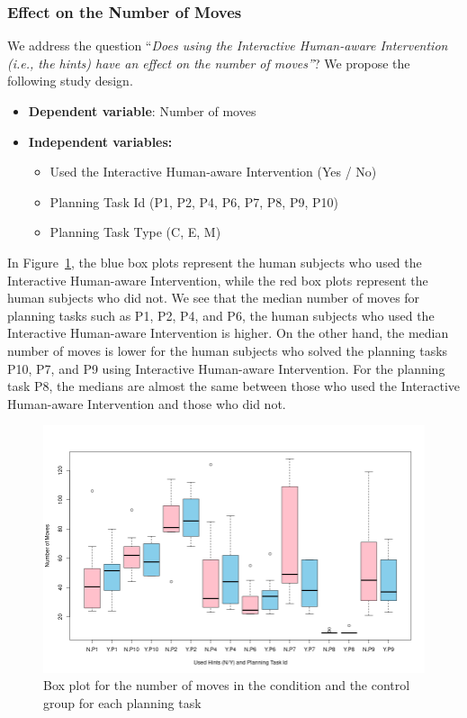 \subsubsection{Effect on the Number of Moves}
We address the question ``\textit{Does using the Interactive Human-aware Intervention (i.e., the hints) have an effect on the number of moves''}?
We propose the following study design.
\begin{itemize}
\item \textbf{Dependent variable}: Number of  moves
\item \textbf{Independent variables:}
\begin{itemize}
\item Used the Interactive Human-aware Intervention (Yes / No)
\item Planning Task Id (P1, P2, P4, P6, P7, P8, P9, P10)
\item Planning Task Type (C, E, M)
\end{itemize}
\end{itemize}

\noindent In Figure~\ref{fig:lenbypid}, the blue box plots represent the human subjects who used the Interactive Human-aware Intervention, while the red box plots represent the human subjects who did not.
We see that the median number of moves for planning tasks such as P1, P2, P4, and P6, the human subjects who used the Interactive Human-aware Intervention is higher.
On the other hand, the median number of moves is lower for the human subjects who solved the planning tasks P10, P7, and P9 using Interactive Human-aware Intervention.
For the planning task P8, the medians are almost the same between those who used the Interactive Human-aware Intervention and those who did not.
\begin{figure}[tpb]
  \centering
\includegraphics[width=0.9\columnwidth]{img/lenbypid.png}
  \caption{Box plot for the number of moves in the condition and the control group for each planning task}
  \label{fig:lenbypid}
\end{figure}

